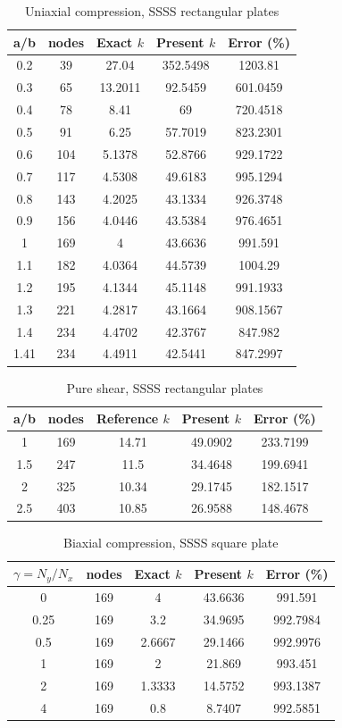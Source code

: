 \begin{table}[htbp]
\centering
\caption{Uniaxial compression, SSSS rectangular plates}
\begin{tabular}{ccccc}
\hline
a/b & nodes & Exact $k$ & Present $k$ & Error (\%) \\
\hline
0.2 & 39 & 27.04 & 352.5498 & 1203.81 \\
0.3 & 65 & 13.2011 & 92.5459 & 601.0459 \\
0.4 & 78 & 8.41 & 69 & 720.4518 \\
0.5 & 91 & 6.25 & 57.7019 & 823.2301 \\
0.6 & 104 & 5.1378 & 52.8766 & 929.1722 \\
0.7 & 117 & 4.5308 & 49.6183 & 995.1294 \\
0.8 & 143 & 4.2025 & 43.1334 & 926.3748 \\
0.9 & 156 & 4.0446 & 43.5384 & 976.4651 \\
1 & 169 & 4 & 43.6636 & 991.591 \\
1.1 & 182 & 4.0364 & 44.5739 & 1004.29 \\
1.2 & 195 & 4.1344 & 45.1148 & 991.1933 \\
1.3 & 221 & 4.2817 & 43.1664 & 908.1567 \\
1.4 & 234 & 4.4702 & 42.3767 & 847.982 \\
1.41 & 234 & 4.4911 & 42.5441 & 847.2997 \\
\hline
\end{tabular}
\end{table}

\begin{table}[htbp]
\centering
\caption{Pure shear, SSSS rectangular plates}
\begin{tabular}{ccccc}
\hline
a/b & nodes & Reference $k$ & Present $k$ & Error (\%) \\
\hline
1 & 169 & 14.71 & 49.0902 & 233.7199 \\
1.5 & 247 & 11.5 & 34.4648 & 199.6941 \\
2 & 325 & 10.34 & 29.1745 & 182.1517 \\
2.5 & 403 & 10.85 & 26.9588 & 148.4678 \\
\hline
\end{tabular}
\end{table}

\begin{table}[htbp]
\centering
\caption{Biaxial compression, SSSS square plate}
\begin{tabular}{ccccc}
\hline
$\gamma=N_y/N_x$ & nodes & Exact $k$ & Present $k$ & Error (\%) \\
\hline
0 & 169 & 4 & 43.6636 & 991.591 \\
0.25 & 169 & 3.2 & 34.9695 & 992.7984 \\
0.5 & 169 & 2.6667 & 29.1466 & 992.9976 \\
1 & 169 & 2 & 21.869 & 993.451 \\
2 & 169 & 1.3333 & 14.5752 & 993.1387 \\
4 & 169 & 0.8 & 8.7407 & 992.5851 \\
\hline
\end{tabular}
\end{table}

